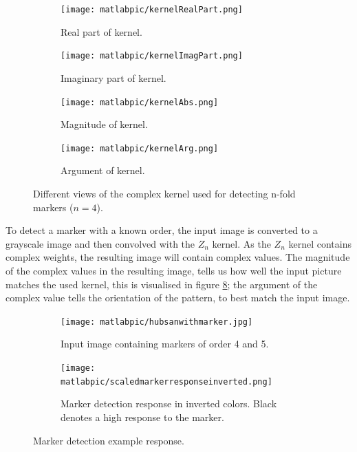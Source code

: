 \documentclass{article}
\begin{document}
\begin{figure} 
\begin{subfigure}[t]{0.46\textwidth} 
\texttt{[image: matlabpic/kernelRealPart.png]} 
\caption{Real part of kernel.} 
\label{figRealPartOfN4Kernel} 
\end{subfigure} 
\begin{subfigure}[t]{0.46\textwidth} 
\texttt{[image: matlabpic/kernelImagPart.png]} 
\caption{Imaginary part of kernel.} 
\label{figImagPartOfN4Kernel} 
\end{subfigure} 
\begin{subfigure}[t]{0.46\textwidth} 
\texttt{[image: matlabpic/kernelAbs.png]} 
\caption{Magnitude of kernel.} 
\label{figMagnitudeOfN4Kernel} 
\end{subfigure} 
\begin{subfigure}[t]{0.46\textwidth} 
\texttt{[image: matlabpic/kernelArg.png]} 
\caption{Argument of kernel.} 
\label{figArgumentOfN4Kernel} 
\end{subfigure} 
\caption{Different views of the complex kernel used for detecting n-fold markers ($n = 4$).} 
\label{figKernelToDetectPlainMarker} 
\end{figure} 
To detect a marker with a known order, the input image is converted to a grayscale image and then convolved with the $Z_n$ kernel. 
As the $Z_n$ kernel contains complex weights, the resulting image will contain complex values. 
The magnitude of the complex values in the resulting image, tells us how well the 
input picture matches the used kernel, this is visualised in figure \ref{figDetectionExample}; 
the argument of the complex value tells the orientation of the 
pattern, to best match the input image. 
\begin{figure} 
\begin{subfigure}[t]{0.46\textwidth} 
\texttt{[image: matlabpic/hubsanwithmarker.jpg]} 
\caption{Input image containing markers of order 4 and 5.} 
\label{figHubsanInputImage} 
\end{subfigure} 
\begin{subfigure}[t]{0.46\textwidth} 
\texttt{[image: matlabpic/scaledmarkerresponseinverted.png]} 
\caption{Marker detection response in inverted colors. Black denotes a high response to the marker.} 
\label{figHubsanMarkerDetectionReponse} 
\end{subfigure} 
\caption{Marker detection example response.} 
\label{figDetectionExample} 
\end{figure} 
\end{document}

